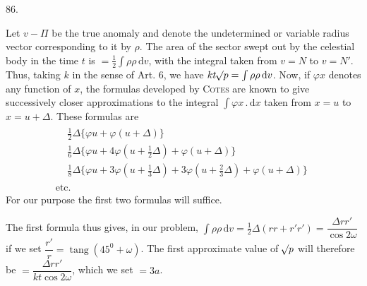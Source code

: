 \par{}\medskip
\hypertarget{native-115-article086}{}
\begin{center}86.\end{center}
Let $v-\Pi$ be the true anomaly and denote the undetermined or variable radius vector corresponding to it by $\rho$. The area of the sector swept out by the celestial body in the time $t$ is $=\tfrac12\int\rho\rho\,\mathrm{d}v$, with the integral taken from $v=N$ to $v=N'$. Thus, taking $k$ in the sense of Art. 6, we have $kt\mathord{{}^{}\!\surd}p=\int\rho\rho\,\mathrm{d}v$. Now, if $\varphi x$ denotes any function of $x$, the formulas developed by \textsc{Cotes} are known to give successively closer approximations to the integral $\int\varphi x\mathbin{.}\mathrm{d}x$ taken from $x=u$ to $x=u+\Delta$. These formulas are
\[
\begin{gathered}
\begin{aligned}
&\tfrac12\Delta\{\varphi u+\varphi(u+\Delta)\}\\[4pt]
&\tfrac16\Delta\{\varphi u+4\varphi(u+\tfrac12\Delta)+\varphi(u+\Delta)\}\\[4pt]
&\tfrac18\Delta\{\varphi u+3\varphi(u+\tfrac13\Delta)+3\varphi(u+\tfrac23\Delta)+\varphi(u+\Delta)\}
\end{aligned}\\[4pt]
\text{etc.}
\end{gathered}
\]
\noindent For our purpose the first two formulas will suffice.

The first formula thus gives, in our problem, $\int\rho\rho\,\mathrm{d}v=\tfrac12\Delta(rr+r'r')=\dfrac{\Delta rr'}{\cos2\omega}$ if we set $\dfrac{r'}r=\operatorname{tang}(45^0+\omega)$. The first approximate value of $\mathord{{}^{}\!\surd}p$ will therefore be $=\dfrac{\Delta rr'}{kt\cos2\omega}$, which we set $=3a$.


